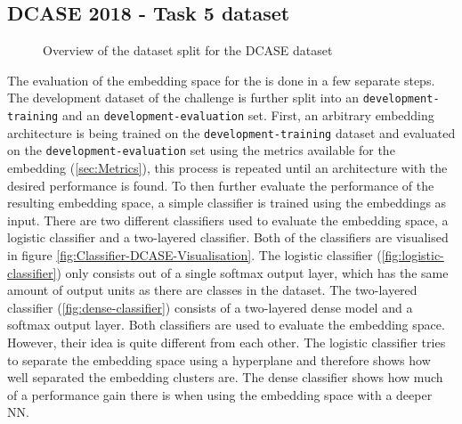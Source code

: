 \subsection{DCASE 2018 - Task 5 dataset}
\label{sub:Eval-DCASE}
\begin{figure}[ht]
    \centering
\caption{Overview of the dataset split for the DCASE dataset}
\label{fig:DCASE-split}
\end{figure}
\noindent
The evaluation of the embedding space for the  is done in a few separate steps. The development dataset of the challenge is further split into an \texttt{development-training} and an \texttt{development-evaluation} set. First, an arbitrary embedding architecture is being trained on the \texttt{development-training} dataset and evaluated on the \texttt{development-evaluation} set using the metrics available for the embedding (\ref{sec:Metrics}), this process is repeated until an architecture with the desired performance is found.
\newline
\newline
To then further evaluate the performance of the resulting embedding space, a simple classifier is trained using the embeddings as input. There are two different classifiers used to evaluate the embedding space, a logistic classifier and a two-layered classifier. Both of the classifiers are visualised in figure \ref{fig:Classifier-DCASE-Visualisation}.
\newline
\newline
The logistic classifier (\ref{fig:logistic-classifier}) only consists out of a single softmax output layer, which has the same amount of output units as there are classes in the dataset. The two-layered classifier (\ref{fig:dense-classifier}) consists of a two-layered dense model and a softmax output layer. Both classifiers are used to evaluate the embedding space. However, their idea is quite different from each other. The logistic classifier tries to separate the embedding space using a hyperplane and therefore shows how well separated the embedding clusters are. The dense classifier shows how much of a performance gain there is when using the embedding space with a deeper \gls{NN}.
